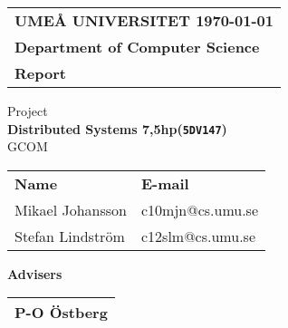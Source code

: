 \documentclass[10pt, titlepage, a4paper, oneside]{article}
\def\inst{Computer Science}
\def\typeofdoc{Report}
\def\course{Distributed Systems 7,5hp(\texttt{5DV147})}
\def\pretitle{Project}
\def\title{GCOM}
\begin{document}
	\begin{titlepage}
		\thispagestyle{empty}
		\begin{large}
			\begin{tabular}{@{}p{\textwidth}@{}}
				\textbf{UMEÅ UNIVERSITET \hfill \today} \\
				\textbf{Department of \inst} \\
				\textbf{\typeofdoc} \\
			\end{tabular}
		\end{large}
		\vspace{10mm}
		\begin{center}
			\LARGE{\pretitle} \\
			\huge{\textbf{\course}}\\
			\vspace{10mm}
			\LARGE{\title} \\
			\vspace{15mm}
			\begin{large}
				\begin{tabular}{ll}
					\textbf{Name} & \textbf{E-mail} \\
					Mikael Johansson & c10mjn@cs.umu.se \\
					Stefan Lindström & c12slm@cs.umu.se \\
				\end{tabular}
			\end{large}
			\vfill
			\large{\textbf{Advisers}}\\
			\vspace{2mm}
			\begin{tabular}{l}
				P-O Östberg \\
				\hline
			\end{tabular}
		\end{center}
	\end{titlepage}


	\rfoot{\footnotesize{\today}}
	\lhead{\sc\footnotesize\title}
	\rhead{\nouppercase{\sc\footnotesize\leftmark}}
	\pagestyle{fancy}
	\renewcommand{\headrulewidth}{0.4pt}
	\renewcommand{\footrulewidth}{0.4pt}
	
	\setlength{\parindent}{0mm}
	
\tableofcontents
\newpage
{}
\setlength{\parskip}{10pt}


\newpage

\end{document}
